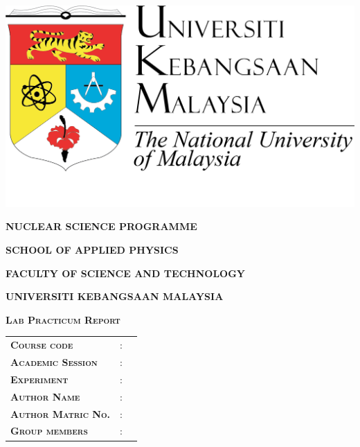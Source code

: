 \documentclass{article}
\begin{document}
\begin{titlepage}
	\centering
	\includegraphics[scale=0.25]{ukm_logo.png}\par
	\vspace{0.5cm}
	{\bfseries\scshape\Large NUCLEAR SCIENCE PROGRAMME \par} 
	{\bfseries\scshape\Large SCHOOL OF APPLIED PHYSICS \par}
	{\bfseries\scshape\Large FACULTY OF SCIENCE AND TECHNOLOGY \par}
	{\bfseries\scshape\Large UNIVERSITI KEBANGSAAN MALAYSIA \par}

	\vspace{1cm}
	
	{\bfseries\scshape\large Lab Practicum Report}

	\vspace{1cm}
	\begin{table}[h]
		\begin{tabular}{lcl}
			\bfseries\scshape\large{\textbf{Course code}}       & : &  \\[0.6cm]
			\bfseries\scshape\large{\textbf{Academic Session}}  & : &  \\[1.3cm]
			\bfseries\scshape\large{\textbf{Experiment}}        & : &  \\[0.6cm]
			\bfseries\scshape\large{\textbf{Author Name}}       & : &  \\[0.6cm]
			\bfseries\scshape\large{\textbf{Author Matric No.}} & : &  \\[0.9cm]
			\bfseries\scshape\large{Group members}              & : &
		

\end{tabular}
\end{table}
\end{titlepage}
\end{document}
